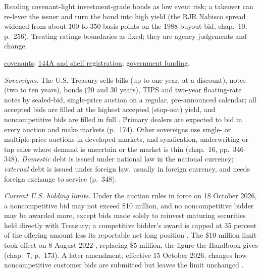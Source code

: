 \begin{qfmethod}
 Reading covenant-light investment-grade bonds as low event risk; a takeover can re-lever the issuer and turn the bond into high yield (the RJR Nabisco spread widened from about 100 to 350 basis points on the 1988 buyout bid, chap.~10, p.~256). Treating ratings boundaries as fixed; they are agency judgements and change.

 \hyperref[def:bond-features-indenture]{covenants}; \hyperref[rule:bond-issuance-legal-tax]{144A and shelf registration}; \hyperref[def:government-agency-supranational-funding]{government funding}.

\end{qfmethod}

\begin{qfdefinition}\label{def:government-agency-supranational-funding}
 \emph{Sovereigns.} The U.S. Treasury sells bills (up to one year, at a discount), notes (two to ten years), bonds (20 and 30 years), TIPS and two-year floating-rate notes by sealed-bid, single-price auction on a regular, pre-announced calendar; all accepted bids are filled at the highest accepted (stop-out) yield, and noncompetitive bids are filled in full \citep[chap.~7, pp.~172--176]{s7-fabozzifixed}. Primary dealers are expected to bid in every auction and make markets (p.~174). Other sovereigns use single- or multiple-price auctions in developed markets, and syndication, underwriting or tap sales where demand is uncertain or the market is thin (chap.~16, pp.~346--348). \emph{Domestic} debt is issued under national law in the national currency; \emph{external} debt is issued under foreign law, usually in foreign currency, and needs foreign exchange to service (p.~348).

\emph{Current U.S. bidding limits.} Under the auction rules in force on 18 October 2026, a noncompetitive bid may not exceed \$10 million, and no noncompetitive bidder may be awarded more, except bids made solely to reinvest maturing securities held directly with Treasury; a competitive bidder's award is capped at 35 percent of the offering amount less its reportable net long position \citep[\S\S~356.12(b)(1) and 356.22]{cfr-31-356-auction-limits}. The \$10 million limit took effect on 8 August 2022 \citep[p.~40438]{fr-2022-13409}, replacing \$5 million, the figure the Handbook gives (chap.~7, p.~173). A later amendment, effective 15 October 2026, changes how noncompetitive customer bids are submitted but leaves the limit unchanged \citep[pp.~65456--65457]{fr-2026-21069}.


\end{qfdefinition}
